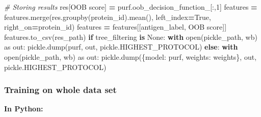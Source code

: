 \documentclass[
  11pt,
  oneside]{book}
\newenvironment{Shaded}{\begin{snugshade}}{\end{snugshade}}
\newcommand{\BuiltInTok}[1]{#1}
\newcommand{\CommentTok}[1]{\textcolor[rgb]{0.56,0.35,0.01}{\textit{#1}}}
\newcommand{\ControlFlowTok}[1]{\textcolor[rgb]{0.13,0.29,0.53}{\textbf{#1}}}
\newcommand{\DecValTok}[1]{\textcolor[rgb]{0.00,0.00,0.81}{#1}}
\newcommand{\ImportTok}[1]{#1}
\newcommand{\KeywordTok}[1]{\textcolor[rgb]{0.13,0.29,0.53}{\textbf{#1}}}
\newcommand{\NormalTok}[1]{#1}
\newcommand{\OperatorTok}[1]{\textcolor[rgb]{0.81,0.36,0.00}{\textbf{#1}}}
\newcommand{\StringTok}[1]{\textcolor[rgb]{0.31,0.60,0.02}{#1}}
\newcommand{\VariableTok}[1]{\textcolor[rgb]{0.00,0.00,0.00}{#1}}
\begin{document}
\begin{Shaded}
\begin{Highlighting}[]
    \CommentTok{\# Storing results}
\NormalTok{    res[}\StringTok{\textquotesingle{}OOB score\textquotesingle{}}\NormalTok{] }\OperatorTok{=}\NormalTok{ purf.oob\_decision\_function\_[:,}\DecValTok{1}\NormalTok{]}
\NormalTok{    features }\OperatorTok{=}\NormalTok{ features.merge(res.groupby(}\StringTok{\textquotesingle{}protein\_id\textquotesingle{}}\NormalTok{).mean(), left\_index}\OperatorTok{=}\VariableTok{True}\NormalTok{, right\_on}\OperatorTok{=}\StringTok{\textquotesingle{}protein\_id\textquotesingle{}}\NormalTok{)}
\NormalTok{    features }\OperatorTok{=}\NormalTok{ features[[}\StringTok{\textquotesingle{}antigen\_label\textquotesingle{}}\NormalTok{, }\StringTok{\textquotesingle{}OOB score\textquotesingle{}}\NormalTok{]]}
\NormalTok{    features.to\_csv(res\_path)}
    \ControlFlowTok{if}\NormalTok{ tree\_filtering }\KeywordTok{is} \VariableTok{None}\NormalTok{:}
        \ControlFlowTok{with} \BuiltInTok{open}\NormalTok{(pickle\_path, }\StringTok{\textquotesingle{}wb\textquotesingle{}}\NormalTok{) }\ImportTok{as}\NormalTok{ out:}
\NormalTok{            pickle.dump(purf, out, pickle.HIGHEST\_PROTOCOL)}
    \ControlFlowTok{else}\NormalTok{:}
        \ControlFlowTok{with} \BuiltInTok{open}\NormalTok{(pickle\_path, }\StringTok{\textquotesingle{}wb\textquotesingle{}}\NormalTok{) }\ImportTok{as}\NormalTok{ out:}
\NormalTok{            pickle.dump(\{}\StringTok{\textquotesingle{}model\textquotesingle{}}\NormalTok{: purf, }\StringTok{\textquotesingle{}weights\textquotesingle{}}\NormalTok{: weights\}, out, pickle.HIGHEST\_PROTOCOL)}
\end{Highlighting}
\end{Shaded}

\hypertarget{training-on-whole-data-set}{%
\subsubsection{Training on whole data set}\label{training-on-whole-data-set}}

\textbf{In Python: }
\end{document}
